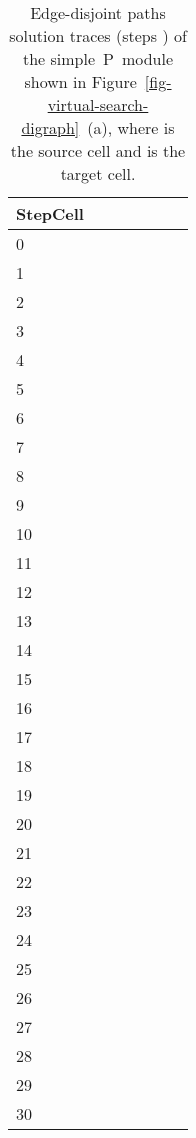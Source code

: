\documentclass[preliminary,copyright,creativecommons]{eptcs}
\newcommand{\myway}[1]{\raisebox{-4pt}{\rule{0pt}{16pt}}\colorbox[rgb]{.7,.7,.7}{#1}}
\theoremstyle{remark}
\begin{document}
\begin{table}[h]
\caption{Edge-disjoint paths solution traces (steps ) of the 
simple~P~module shown in Figure~\ref{fig-virtual-search-digraph}~(a),
where  is the source cell and  is the target cell.}
\label{tab-trace}
\begin{center}
\renewcommand{\tabcolsep}{3.0pt}
\renewcommand{\arraystretch}{1.3}
\footnotesize
\noindent
\begin{tabular}{ | l | l | l | l | l | l | l | }
\hline
StepCell
 &  &  &  &  &  &  \\ \hline
0 &  &  &  &  &  &  \\ \hline
1 &  &  &  &  &  &  \\ \hline
2 &  &  &  &  &  &  \\ \hline
3 &  &  &  &  &  &  \\ \hline
4 & \myway{} &  &  &  &  &  \\ \hline
5 &  & \myway{} &  & \myway{} &  &  \\ \hline
6 &  &  & \myway{} &  & \myway{} &  \\ \hline
7 &  &  &  &  &  & \myway{} \\ \hline
8 &  &  &  &  &  &  \\ \hline
9 &  &  &  &  &  &  \\ \hline
10 &  &  &  &  &  &  \\ \hline
11 &  &  &  &  &  &  \\ \hline
12 &  &  &  &  &  &  \\ \hline
13 &  &  &  &  &  &  \\ \hline
14 &  &  &  &  &  &  \\ \hline
15 &  &  &  &  &  &  \\ \hline
16 &  &  &  &  &  &  \\ \hline
17 &  &  &  &  &  &  \\ \hline
18 &  &  &  &  &  &  \\ \hline
19 &  &  &  &  &  &  \\ \hline
20 &  &  &  &  &  &  \\ \hline
21 &  &  &  &  &  &  \\ \hline
22 &  &  &  &  &  & \myway{} \\ \hline
23 &  &  & \myway{} &  &  &  \\ \hline
24 &  &  &  & \myway{} &  &  \\ \hline
25 & \myway{} &  &  &  &  &  \\ \hline
26 &  &  &  &  &  &  \\ \hline
27 &  &  &  &  &  &  \\ \hline
28 &  &  &  &  &  &  \\ \hline
29 &  &  &  &  &  &  \\ \hline
30 &  &  &  &  &  &  \\ \hline
\end{tabular}
\end{center}
\end{table}
\end{document}

